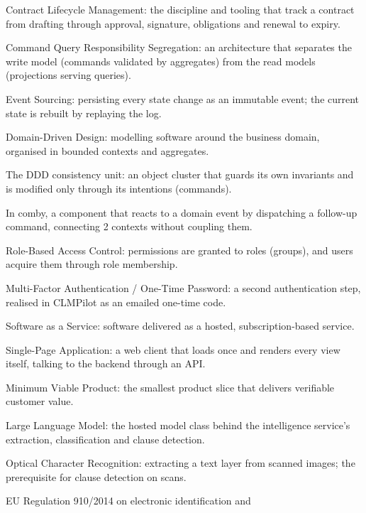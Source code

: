\begin{description}[itemsep=1pt, font=\normalfont\bfseries]
  \item[CLM] Contract Lifecycle Management: the discipline and tooling
    that track a contract from drafting through approval, signature,
    obligations and renewal to expiry.
  \item[CQRS] Command Query Responsibility Segregation: an architecture
    that separates the write model (commands validated by aggregates)
    from the read models (projections serving queries).
  \item[ES] Event Sourcing: persisting every state change as an
    immutable event; the current state is rebuilt by replaying the log.
  \item[DDD] Domain-Driven Design: modelling software around the
    business domain, organised in bounded contexts and aggregates.
  \item[Aggregate] The DDD consistency unit: an object cluster that
    guards its own invariants and is modified only through its
    intentions (commands).
  \item[Reactor] In comby, a component that reacts to a domain event by
    dispatching a follow-up command, connecting 2 contexts without
    coupling them.
  \item[RBAC] Role-Based Access Control: permissions are granted to
    roles (groups), and users acquire them through role membership.
  \item[MFA / OTP] Multi-Factor Authentication / One-Time Password: a
    second authentication step, realised in CLMPilot as an emailed
    one-time code.
  \item[SaaS] Software as a Service: software delivered as a hosted,
    subscription-based service.
  \item[SPA] Single-Page Application: a web client that loads once and
    renders every view itself, talking to the backend through an API.
  \item[MVP] Minimum Viable Product: the smallest product slice that
    delivers verifiable customer value.
  \item[LLM] Large Language Model: the hosted model class behind the
    intelligence service's extraction, classification and clause
    detection.
  \item[OCR] Optical Character Recognition: extracting a text layer
    from scanned images; the prerequisite for clause detection on scans.
  \item[eIDAS] EU Regulation 910/2014 on electronic identification and

\end{description}

